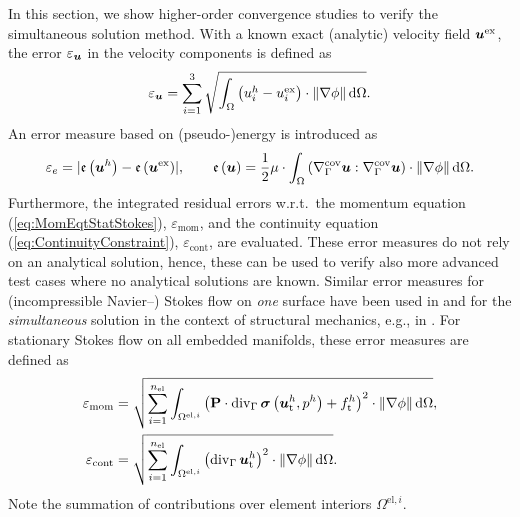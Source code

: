 \documentclass[12pt, twoside, english]{article}
\numberwithin{equation}{section}
\newcommand{\vek}[1]{\mathchoice{\displaystyle\boldsymbol#1}
{\textstyle\boldsymbol#1}{\scriptstyle\boldsymbol#1}
{\scriptscriptstyle\boldsymbol#1}}
\newcommand{\mat}[1]{\mathchoice{\displaystyle\mathbf#1}
{\textstyle\mathbf#1}{\scriptstyle\mathbf#1}
{\scriptscriptstyle\mathbf#1}}
\newcommand{\ti}{ \ensuremath{\mathrm{t} }}
\begin{document}
In this section, we show higher-order convergence studies to verify the simultaneous solution method. With a known exact (analytic) velocity field $\vek{u}^{\mathrm{ex}}$, the error $\varepsilon_{\vek{u}}$ in the velocity components is defined as
\begin{equation}
	\varepsilon_{\vek{u}} = \sum_{i=1}^{3}\sqrt{\int_{\Omega}\left(u^h_i - u^{\mathrm{ex}}_i\right) \cdot \lVert \nabla \phi \rVert\,\mathrm{d}\Omega}.\label{eq:VelErrorNorm}
\end{equation}
An error measure based on (pseudo-)energy \cite{Auricchio_2017a} is introduced as 
\begin{equation}
	\varepsilon_e = \lvert \mathfrak{e}\left(\vek{u}^h\right) - \mathfrak{e}\left(\vek{u}^{\mathrm{ex}}\right)\rvert, \qquad \mathfrak{e}\left(\vek{u}\right) = \frac{1}{2} \mu \cdot \int_{\Omega} \left(\nabla_{\Gamma}^{\mathrm{cov}} \vek{u} : \nabla_{\Gamma}^{\mathrm{cov}} \vek{u}\right) \cdot \lVert \nabla \phi \rVert \,\mathrm{d}\Omega.\label{eq:EnergyError}
\end{equation} 
Furthermore, the integrated residual errors w.r.t.~the momentum equation (\ref{eq:MomEqtStatStokes}), $\varepsilon_{\mathrm{mom}}$, and the continuity equation (\ref{eq:ContinuityConstraint}), $\varepsilon_{\mathrm{cont}}$, are evaluated. These error measures do not rely on an analytical solution, hence, these can be used to verify also more advanced test cases where no analytical solutions are known. Similar error measures for (incompressible Navier--) Stokes flow on \emph{one} surface have been used in \cite{Fries_2018a} and for the \emph{simultaneous} solution in the context of structural  mechanics, e.g., in \cite{Fries_2023a,Kaiser_2024a}. For stationary Stokes flow on all embedded manifolds, these error measures are defined as
\begin{align}
	\varepsilon_{\mathrm{mom}} &= \sqrt{\sum_{i=1}^{n_{\mathrm{el}}} \int_{\Omega^{\mathrm{el},i}}\left(\mat{P} \cdot \mathrm{div}_{\Gamma}\,\vek{\sigma}\left(\vek{u}_\ti^h,p^h\right) +  f_\ti^h\right)^2\cdot \lVert \nabla \phi \rVert\,\mathrm{d}\Omega},\label{eq:ResErrorMom}\\
	\varepsilon_{\mathrm{cont}} &= \sqrt{\sum_{i=1}^{n_{\mathrm{el}}} \int_{\Omega^{\mathrm{el},i}}\left(\mathrm{div}_{\Gamma}\,\vek{u}_\ti^h\right)^2\cdot \lVert \nabla \phi \rVert\,\mathrm{d}\Omega}.\label{eq:ResErrorCont}
\end{align}
Note the summation of contributions over element interiors $\Omega^{\mathrm{el},i}$.\\
\end{document}
